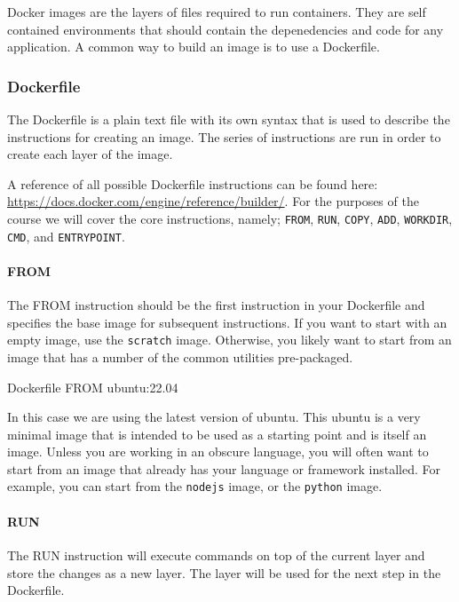 \documentclass{csse4400}
\begin{document}
Docker images are the layers of files required to run containers.
They are self contained environments that should contain the depenedencies and code for any application.
A common way to build an image is to use a Dockerfile.

\subsubsection{Dockerfile}

The Dockerfile is a plain text file with its own syntax that is used to describe the instructions for creating an image.
The series of instructions are run in order to create each layer of the image.

A reference of all possible Dockerfile instructions can be found here: \url{https://docs.docker.com/engine/reference/builder/}.
For the purposes of the course we will cover the core instructions, namely;
\texttt{FROM}, \texttt{RUN}, \texttt{COPY}, \texttt{ADD}, \texttt{WORKDIR}, \texttt{CMD}, and \texttt{ENTRYPOINT}.

\paragraph{FROM}
The FROM instruction should be the first instruction in your Dockerfile and specifies the base image for subsequent instructions.
If you want to start with an empty image,
use the \texttt{scratch} image.
Otherwise, you likely want to start from an image that has a number of the common utilities pre-packaged.

\begin{code}[language=docker,numbers=none]{Dockerfile}
FROM ubuntu:22.04
\end{code}

In this case we are using the latest version of ubuntu.
This ubuntu is a very minimal image that is intended to be used as a starting point and is itself an image.
Unless you are working in an obscure language,
you will often want to start from an image that already has your language or framework installed.
For example, you can start from the \texttt{nodejs} image,
or the \texttt{python} image.


\paragraph{RUN}
The RUN instruction will execute commands on top of the current layer and store the changes as a new layer.
The layer will be used for the next step in the Dockerfile.
\end{document}
